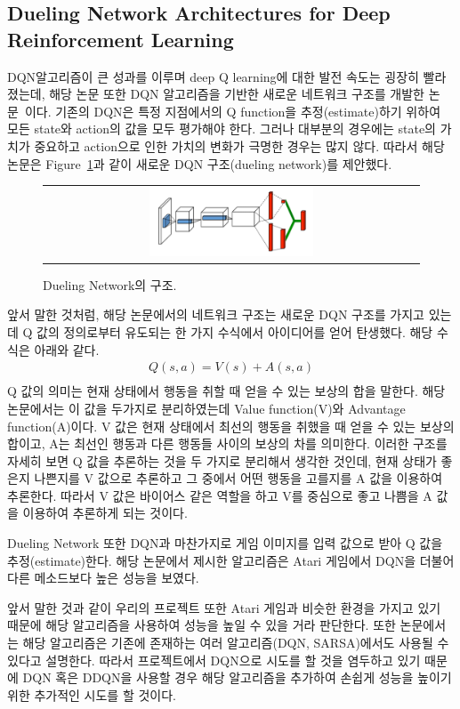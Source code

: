 \subsection{Dueling Network Architectures for Deep Reinforcement Learning}
\label{sec:survey:DuelNet}
DQN알고리즘이 큰 성과를 이루며 deep Q learning에 대한 발전 속도는 굉장히 빨라졌는데, 해당 논문 또한 DQN 알고리즘을 기반한 새로운 네트워크 구조를 개발한 논문~\cite{DuelNet}이다. 
기존의 DQN은 특정 지점에서의 Q function을 추정(estimate)하기 위하여 모든 state와 action의 값을 모두 평가해야 한다. 
그러나 대부분의 경우에는 state의 가치가 중요하고 action으로 인한 가치의 변화가 극명한 경우는 많지 않다. 
따라서 해당 논문은 Figure~\ref{fig:dueling_network}과 같이 새로운 DQN 구조(dueling network)를 제안했다.

\begin{figure}[h]
\begin{center}
\begin{tabular}{c}
     \includegraphics[width=0.45\textwidth]{FIG/DuelingNetwork.png} \\
\end{tabular}
\caption{
	Dueling Network의 구조.
}
\label{fig:dueling_network}
\end{center}
\end{figure}

앞서 말한 것처럼, 해당 논문에서의 네트워크 구조는 새로운 DQN 구조를 가지고 있는데 Q 값의 정의로부터 유도되는 한 가지 수식에서 아이디어를 얻어 탄생했다. 
해당 수식은 아래와 같다. 
\begin{align*}
	Q(s,a) = V(s) + A(s,a) \\
\end{align*}
Q 값의 의미는 현재 상태에서 행동을 취할 때 얻을 수 있는 보상의 합을 말한다. 
해당 논문에서는 이 값을 두가지로 분리하였는데 Value function(V)와 Advantage function(A)이다. 
V 값은 현재 상태에서 최선의 행동을 취했을 때 얻을 수 있는 보상의 합이고, A는 최선인 행동과 다른 행동들 사이의 보상의 차를 의미한다. 
이러한 구조를 자세히 보면 Q 값을 추론하는 것을 두 가지로 분리해서 생각한 것인데, 현재 상태가 좋은지 나쁜지를 V 값으로 추론하고 그 중에서 어떤 행동을 고를지를 A 값을 이용하여 추론한다. 
따라서 V 값은 바이어스 같은 역할을 하고 V를 중심으로 좋고 나쁨을 A 값을 이용하여 추론하게 되는 것이다. 

Dueling Network 또한 DQN과 마찬가지로 게임 이미지를 입력 값으로 받아 Q 값을 추정(estimate)한다. 
해당 논문에서 제시한 알고리즘은 Atari 게임에서 DQN을 더불어 다른 메소드보다 높은 성능을 보였다.

앞서 말한 것과 같이 우리의 프로젝트 또한 Atari 게임과 비슷한 환경을 가지고 있기 때문에 해당 알고리즘을 사용하여 성능을 높일 수 있을 거라 판단한다. 
또한 논문에서는 해당 알고리즘은 기존에 존재하는 여러 알고리즘(DQN, SARSA)에서도 사용될 수 있다고 설명한다. 
따라서 프로젝트에서 DQN으로 시도를 할 것을 염두하고 있기 때문에 DQN 혹은 DDQN을 사용할 경우 해당 알고리즘을 추가하여 손쉽게 성능을 높이기 위한 추가적인 시도를 할 것이다.
